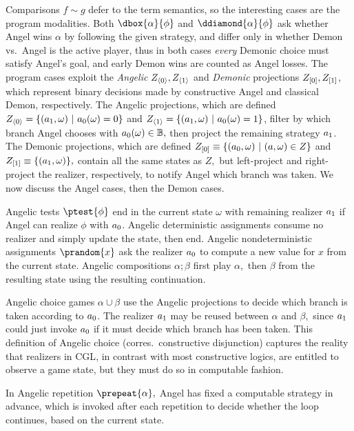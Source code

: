 \documentclass[12pt]{cmuthesis}
\theoremstyle{definition}
\theoremstyle{remark}
\newcommand{\om}{\omega}
\newcommand{\CGL}{\textsf{CGL}\xspace}
\begin{document}
Comparisons $f \sim g$ defer to the term semantics, so the interesting cases are the program modalities.
Both $\dbox{\alpha}{\phi}$ and $\ddiamond{\alpha}{\phi}$ ask whether Angel wins $\alpha$ by following the given strategy, and differ only in whether Demon vs.\ Angel is the active player, thus in both cases \emph{every} Demonic choice must satisfy Angel's goal, and early Demon wins are counted as Angel losses.
The program cases exploit the \emph{Angelic} $Z_{\langle{0}\rangle}, Z_{\langle{1}\rangle}$ and \emph{Demonic} projections $Z_{[0]}, Z_{[1]}$, which represent binary decisions made by constructive Angel and classical Demon, respectively.
The Angelic projections, which are defined $\apL{Z} = \{(\rzSnd{\aa}, \om)~|~\rzFst{\aa}(\om)=0\}$ and $\apR{Z} = \{(\rzSnd{\aa}, \om)~|~\rzFst{\aa}(\om)=1\}$, filter by which branch Angel chooses with $\rzFst{\aa}(\om) \in \mathbb{B},$ then project the remaining strategy $a_1$.
The Demonic projections, which are defined $\dpL{Z} \equiv \{(\rzFst{\aa},\om)~|~(\aa,\om) \in Z\}$ and $\dpR{Z} \equiv \{(\rzSnd{\aa},\om)\},$ contain all the same states as $Z,$ but left-project and right-project the realizer, respectively, to notify Angel which branch was taken.
We now discuss the Angel cases, then the Demon cases.

Angelic tests $\ptest{\phi}$ end in the current state $\om$ with remaining realizer $a_1$ if Angel can realize $\phi$ with $a_0$.
Angelic deterministic assignments consume no realizer and simply update the state, then end.
Angelic nondeterministic assignments $\prandom{x}$ ask the realizer $a_0$ to compute a new value for $x$ from the current state.
Angelic compositions $\alpha;\beta$ first play $\alpha,$ then $\beta$ from the resulting state using the resulting continuation.

Angelic choice games $\alpha \cup \beta$ use the Angelic projections to decide which branch is taken according to $a_0$.
The realizer $a_1$ may be reused between $\alpha$ and $\beta,$ since $a_1$ could just invoke $a_0$ if it must decide which branch has been taken.
This definition of Angelic choice (corres.\ constructive disjunction) captures the reality that realizers in \CGL, in contrast with most constructive logics, are entitled to observe a game state, but they must do so in computable fashion.

In Angelic repetition $\prepeat{\alpha},$ Angel has fixed a computable strategy in advance, which is invoked after each repetition to decide whether the loop continues, based on the current state.
\end{document}
